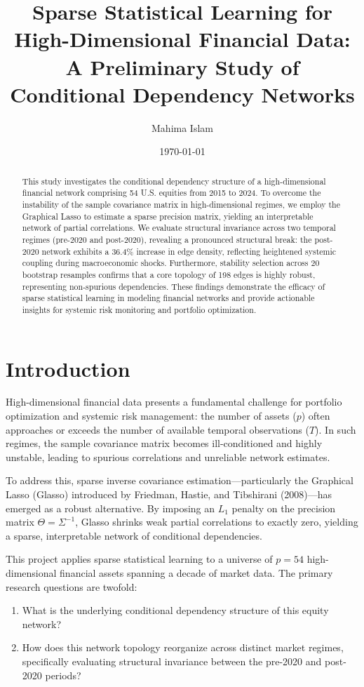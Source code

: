 \documentclass[11pt]{article}
\title{Sparse Statistical Learning for High-Dimensional Financial Data:\\
A Preliminary Study of Conditional Dependency Networks}
\author{Mahima Islam}
\date{\today}
\begin{document}
\maketitle

\begin{abstract}
This study investigates the conditional dependency structure of a high-dimensional financial network comprising 54 U.S. equities from 2015 to 2024. To overcome the instability of the sample covariance matrix in high-dimensional regimes, we employ the Graphical Lasso to estimate a sparse precision matrix, yielding an interpretable network of partial correlations. We evaluate structural invariance across two temporal regimes (pre-2020 and post-2020), revealing a pronounced structural break: the post-2020 network exhibits a 36.4\% increase in edge density, reflecting heightened systemic coupling during macroeconomic shocks. Furthermore, stability selection across 20 bootstrap resamples confirms that a core topology of 198 edges is highly robust, representing non-spurious dependencies. These findings demonstrate the efficacy of sparse statistical learning in modeling financial networks and provide actionable insights for systemic risk monitoring and portfolio optimization.
\end{abstract}

\section{Introduction}
High-dimensional financial data presents a fundamental challenge for portfolio optimization and systemic risk management: the number of assets ($p$) often approaches or exceeds the number of available temporal observations ($T$). In such regimes, the sample covariance matrix becomes ill-conditioned and highly unstable, leading to spurious correlations and unreliable network estimates.

To address this, sparse inverse covariance estimation—particularly the Graphical Lasso (Glasso) introduced by Friedman, Hastie, and Tibshirani (2008)—has emerged as a robust alternative. By imposing an $L_1$ penalty on the precision matrix $\Theta = \Sigma^{-1}$, Glasso shrinks weak partial correlations to exactly zero, yielding a sparse, interpretable network of conditional dependencies.

This project applies sparse statistical learning to a universe of $p = 54$ high-dimensional financial assets spanning a decade of market data. The primary research questions are twofold:
\begin{enumerate}
    \item What is the underlying conditional dependency structure of this equity network?
    \item How does this network topology reorganize across distinct market regimes, specifically evaluating structural invariance between the pre-2020 and post-2020 periods?
\end{enumerate}
\end{document}
